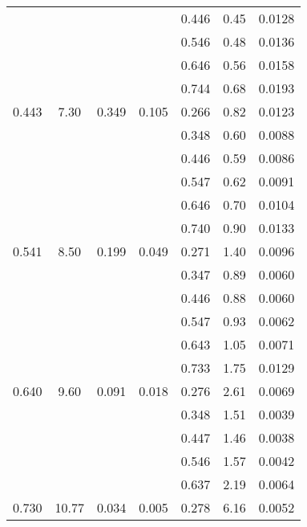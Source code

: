 \begin{table}[htbp]
\begin{center}
\begin{tabular}{|ccccc||c|c|}
         &          &          &          &    0.446 &      0.45 &    0.0128 \\
         &          &          &          &    0.546 &      0.48 &    0.0136 \\
         &          &          &          &    0.646 &      0.56 &    0.0158 \\
         &          &          &          &    0.744 &      0.68 &    0.0193 \\
   0.443 &    7.30 &   0.349 &    0.105 &    0.266 &      0.82 &    0.0123 \\
         &          &          &          &    0.348 &      0.60 &    0.0088 \\
         &          &          &          &    0.446 &      0.59 &    0.0086 \\
         &          &          &          &    0.547 &      0.62 &    0.0091 \\
         &          &          &          &    0.646 &      0.70 &    0.0104 \\
         &          &          &          &    0.740 &      0.90 &    0.0133 \\
   0.541 &    8.50 &   0.199 &    0.049 &    0.271 &      1.40 &    0.0096 \\
         &          &          &          &    0.347 &      0.89 &    0.0060 \\
         &          &          &          &    0.446 &      0.88 &    0.0060 \\
         &          &          &          &    0.547 &      0.93 &    0.0062 \\
         &          &          &          &    0.643 &      1.05 &    0.0071 \\
         &          &          &          &    0.733 &      1.75 &    0.0129 \\
   0.640 &    9.60 &   0.091 &    0.018 &    0.276 &      2.61 &    0.0069 \\
         &          &          &          &    0.348 &      1.51 &    0.0039 \\
         &          &          &          &    0.447 &      1.46 &    0.0038 \\
         &          &          &          &    0.546 &      1.57 &    0.0042 \\
         &          &          &          &    0.637 &      2.19 &    0.0064 \\
   0.730 &   10.77 &   0.034 &    0.005 &    0.278 &      6.16 &    0.0052 \\

\end{tabular}
\end{center}
\end{table}
